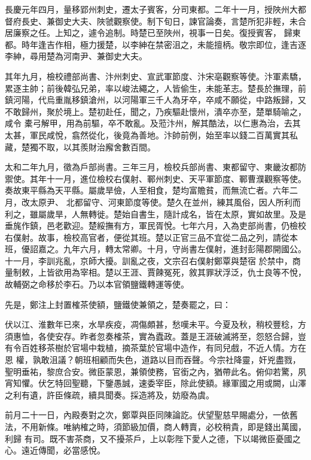 \begin{pinyinscope}
 長慶元年四月，量移郢州刺史，遷太子賓客，分司東都。二年十一月，授陜州大都督府長史、兼御史大夫、陜虢觀察使。制下旬日，諫官論奏，言楚所犯非輕，未合居廉察之任。上知之，遽令追制。時楚已至陜州，視事一日矣。復授賓客，
 歸東都。時年逢吉作相，極力援楚，以李紳在禁密沮之，未能擅柄。敬宗即位，逢吉逐李紳，尋用楚為河南尹、兼御史大夫。



 其年九月，檢校禮部尚書、汴州刺史、宣武軍節度、汴宋亳觀察等使。汴軍素驕，累逐主帥；前後韓弘兄弟，率以峻法繩之，人皆偷生，未能革志。楚長於撫理，前鎮河陽，代烏重胤移鎮滄州，以河陽軍三千人為牙卒，卒咸不願從，中路叛歸，又不敢歸州，聚於境上。楚初赴任，聞之，乃疾驅赴懷州，潰卒亦至，楚單騎喻之，咸令
 橐弓解甲，用為前驅，卒不敢亂。及蒞汴州，解其酷法，以仁惠為治，去其太甚，軍民咸悅，翕然從化，後竟為善地。汴帥前例，始至率以錢二百萬實其私藏，楚獨不取，以其羨財治廨舍數百間。



 太和二年九月，徵為戶部尚書。三年三月，檢校兵部尚書、東都留守、東畿汝都防禦使。其年十一月，進位檢校右僕射、鄆州刺史、天平軍節度、鄆曹濮觀察等使。奏故東平縣為天平縣。屬歲旱儉，人至相食，楚均富贍貧，而無流亡者。六年二月，改太原尹、
 北都留守、河東節度等使。楚久在並州，練其風俗，因人所利而利之，雖屬歲旱，人無轉徙。楚始自書生，隨計成名，皆在太原，實如故里。及是垂旄作鎮，邑老歡迎。楚綏撫有方，軍民胥悅。七年六月，入為吏部尚書，仍檢校右僕射。故事，檢校高官者，便從其班。楚以正官三品不宜從二品之列，請從本班，優詔嘉之。九年六月，轉太常卿。十月，守尚書左僕射，進封彭陽郡開國公。十一月，李訓兆亂，京師大擾。訓亂之夜，文宗召右僕射鄭覃與楚宿
 於禁中，商量制敕，上皆欲用為宰相。楚以王涯、賈餗冤死，敘其罪狀浮泛，仇士良等不悅，故輔弼之命移於李石。乃以本官領鹽鐵轉運等使。



 先是，鄭注上封置榷茶使額，鹽鐵使兼領之，楚奏罷之，曰：



 伏以江、淮數年已來，水旱疾疫，凋傷頗甚，愁嘆未平。今夏及秋，稍校豐稔，方須惠恤，各使安存。昨者忽奏榷茶，實為蠹政。蓋是王涯破滅將至，怨怒合歸，豈有令百姓移茶樹於官場中栽植，摘茶葉於官場中造作，有同兒戲，不近人情。方在恩
 權，孰敢沮議？朝班相顧而失色，道路以目而吞聲。今宗社降靈，奸兇盡戮，聖明垂祐，黎庶合安。微臣蒙恩，兼領使務，官銜之內，猶帶此名。俯仰若驚，夙宵知懼。伏乞特回聖聽，下鑒愚誠，速委宰臣，除此使額。緣軍國之用或闕，山澤之利有遺，許臣條疏，續具聞奏。採造將及，妨廢為虞。



 前月二十一日，內殿奏對之次，鄭覃與臣同陳論訖。伏望聖慈早賜處分，一依舊法，不用新條。唯納榷之時，須節級加價，商人轉賣，必校稍貴，即是錢出萬國，利歸
 有司。既不害茶商，又不擾茶戶，上以彰陛下愛人之德，下以竭微臣憂國之心。遠近傳聞，必當感悅。




\end{pinyinscope}
